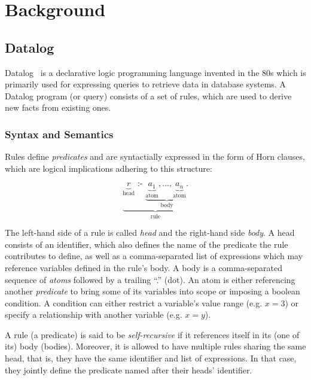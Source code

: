 
\chapter{Background}\label{ch:background}

\section{Datalog}

Datalog~\cite{green2013datalog} is a declarative logic programming language
invented in the 80s which is primarily used for expressing queries to retrieve
data in database systems.
A Datalog program (or query) consists of a set of rules, which are used to
derive new facts from existing ones.

\subsection{Syntax and Semantics}

Rules define \emph{predicates} and are syntactially expressed in the form of
Horn clauses, which are logical implications adhering to this structure:

\begin{equation}
	\underbrace{
	\underbrace{r}_{\text{head}}
	\text{ :- }
	\underbrace{
	\underbrace{a_1}_{\text{atom}},
	\ldots,
	\underbrace{a_n}_{\text{atom}}.
	}_{\text{body}}
	}_{\text{rule}}
\end{equation}

The left-hand side of a rule is called \emph{head} and the right-hand side \emph{body}.
A head consists of an identifier, which also defines the name of the predicate
the rule contributes to define, as well as a comma-separated list of expressions
which may reference variables defined in the rule's body.
A body is a comma-separated sequence of \emph{atoms} followed by a trailing ``.'' (dot).
An atom is either referencing another \emph{predicate} to bring some of its
variables into scope or imposing a boolean condition.
A condition can either restrict a variable's value range (e.g. \(x = 3\))
or specify a relationship with another variable (e.g. \(x = y\)).

A rule (a predicate) is said to be \emph{self-recursive}
if it references itself in its (one of its) body (bodies).
Moreover, it is allowed to have multiple rules sharing the same head, that is,
they have the same identifier and list of expressions.
In that case, they jointly define the predicate named after their heads' identifier.


